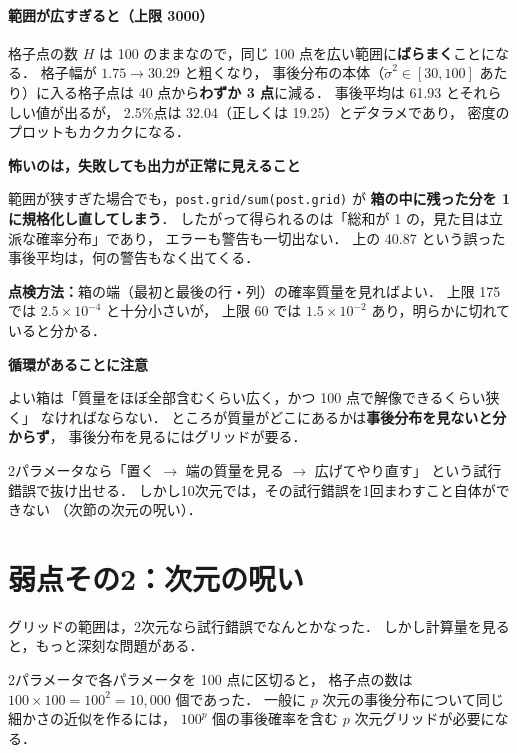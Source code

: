 \documentclass[lualatex,ja=standard,a4paper,12pt]{bxjsarticle}
\begin{document}
\paragraph{範囲が広すぎると（上限 3000）}
格子点の数 $H$ は 100 のままなので，同じ 100 点を広い範囲に\textbf{ばらまく}ことになる．
格子幅が $1.75 \to 30.29$ と粗くなり，
事後分布の本体（$\tilde{\sigma}^2 \in [30, 100]$ あたり）に入る格子点は
40 点から\textbf{わずか 3 点}に減る．
事後平均は 61.93 とそれらしい値が出るが，
2.5\%点は 32.04（正しくは 19.25）とデタラメであり，
密度のプロットもカクカクになる．

\begin{warningbox}
\textbf{怖いのは，失敗しても出力が正常に見えること}

範囲が狭すぎた場合でも，\texttt{post.grid/sum(post.grid)} が
\textbf{箱の中に残った分を 1 に規格化し直してしまう}．
したがって得られるのは「総和が 1 の，見た目は立派な確率分布」であり，
エラーも警告も一切出ない．
上の 40.87 という誤った事後平均は，何の警告もなく出てくる．

\medskip
\textbf{点検方法：}箱の端（最初と最後の行・列）の確率質量を見ればよい．
上限 175 では $2.5 \times 10^{-4}$ と十分小さいが，
上限 60 では $1.5 \times 10^{-2}$ あり，明らかに切れていると分かる．
\end{warningbox}

\begin{pointbox}
\textbf{循環があることに注意}

よい箱は「質量をほぼ全部含むくらい広く，かつ 100 点で解像できるくらい狭く」
なければならない．
ところが質量がどこにあるかは\textbf{事後分布を見ないと分からず}，
事後分布を見るにはグリッドが要る．

\medskip
2パラメータなら「置く $\to$ 端の質量を見る $\to$ 広げてやり直す」
という試行錯誤で抜け出せる．
しかし10次元では，その試行錯誤を1回まわすこと自体ができない
（次節の次元の呪い）．
\end{pointbox}

\section{弱点その2：次元の呪い}

グリッドの範囲は，2次元なら試行錯誤でなんとかなった．
しかし計算量を見ると，もっと深刻な問題がある．

\medskip
2パラメータで各パラメータを 100 点に区切ると，
格子点の数は $100 \times 100 = 100^2 = 10{,}000$ 個であった．
一般に $p$ 次元の事後分布について同じ細かさの近似を作るには，
$100^p$ 個の事後確率を含む $p$ 次元グリッドが必要になる．
\end{document}
